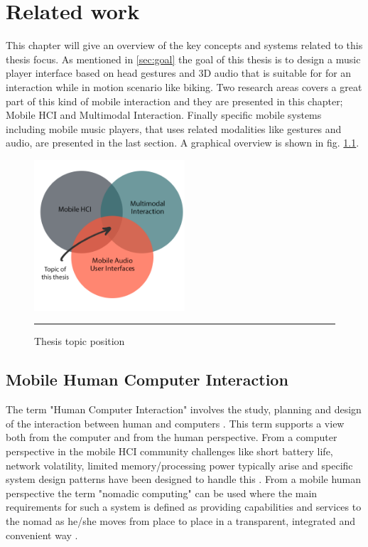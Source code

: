 \chapter{Related work}
\label{sec:relatedwork}
This chapter will give an overview of the key concepts and systems related to this thesis focus. As mentioned in \ref{sec:goal} the goal of this thesis is to design a music player interface based on head gestures and 3D audio that is suitable for for an interaction while in motion scenario like biking. Two research areas covers a great part of this kind of mobile interaction and they are presented in this chapter; Mobile HCI and Multimodal Interaction. Finally specific mobile systems including mobile music players, that uses related modalities like gestures and audio, are presented in the last section. A graphical overview is shown in fig. \ref{fig:venn}.

\begin{figure}[t]
	\centering
		\includegraphics[width=0.5\textwidth,height=\textheight,keepaspectratio]{./Figures/venn.png}
		\rule{35em}{0.5pt}
	\caption[Venn diagram]{Thesis topic position}
	\label{fig:venn}
\end{figure}


\section{Mobile Human Computer Interaction}
The term "Human Computer Interaction" involves the study, planning and design of the interaction between human and computers \cite{card_psychology_1983}. This term supports a view both from the computer and from the human perspective. From a computer perspective in the mobile HCI community challenges like short battery life, network volatility, limited memory/processing power typically arise and specific system design patterns have been designed to handle this \cite{roth_patterns_2002}. From a mobile human perspective the term "nomadic computing" can be used where the main requirements for such a system is defined as providing capabilities and services to the nomad as he/she moves from place to place in a transparent, integrated and convenient way \cite{sawhney_nomadic_2000}.

